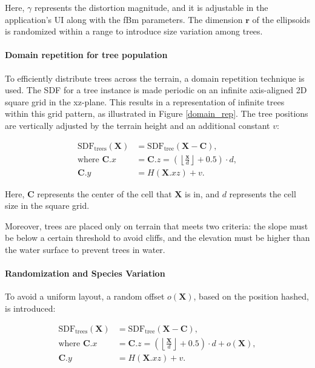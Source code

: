 Here, $\gamma$ represents the distortion magnitude, and it is adjustable in the application's UI along with the fBm parameters. The dimension $\mathbf{r}$ of the ellipsoids is randomized within a range to introduce size variation among trees.

\paragraph{Domain repetition for tree population}
To efficiently distribute trees across the terrain, a domain repetition \cite{quilez_domain_nodate} technique is used. The SDF for a tree instance is made periodic on an infinite axis-aligned 2D square grid in the xz-plane. This results in a representation of infinite trees within this grid pattern, as illustrated in Figure \ref{domain_rep}. The tree positions are vertically adjusted by the terrain height and an additional constant $v$:

\begin{equation}
\begin{aligned}
\text{SDF}_\text{trees}(\mathbf{X}) &= \text{SDF}_\text{tree}(\mathbf{X} - \mathbf{C}), \\
\text{where } \mathbf{C}.x &= \mathbf{C}.z = \left(\left\lfloor \frac{\mathbf{x}}{d} \right\rfloor + 0.5\right) \cdot d, \\
\mathbf{C}.y &= H(\mathbf{X}.{xz}) + v.
\end{aligned}
\end{equation}

Here, $\mathbf{C}$ represents the center of the cell that $\mathbf{X}$ is in, and $d$ represents the cell size in the square grid. 

Moreover, trees are placed only on terrain that meets two criteria: the slope must be below a certain threshold to avoid cliffs, and the elevation must be higher than the water surface to prevent trees in water.

\paragraph{Randomization and Species Variation}
To avoid a uniform layout, a random offset $o(\mathbf{X})$, based on the position hashed, is introduced:

\begin{equation}
\begin{aligned}
\text{SDF}_\text{trees}(\mathbf{X}) &= \text{SDF}_\text{tree}(\mathbf{X} - \mathbf{C}), \\
\text{where } \mathbf{C}.x &= \mathbf{C}.z = \left(\left\lfloor \frac{\mathbf{X}}{d} \right\rfloor + 0.5\right) \cdot d + o(\mathbf{X}), \\
\mathbf{C}.y &= H(\mathbf{X}.{xz}) + v.
\end{aligned}
\end{equation}

